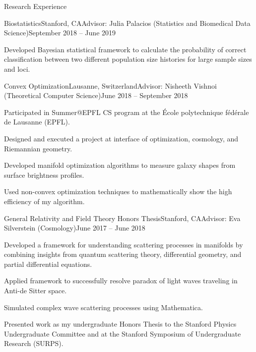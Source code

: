 \documentclass{resume} %
\begin{document}
\begin{rSection}{Research Experience}
\begin{rSubsection}{Biostatistics}{Stanford, CA}{Advisor: Julia Palacios (Statistics and Biomedical Data Science)}{September 2018 -- June 2019}
\item Developed Bayesian statistical framework to calculate the probability of correct classification between two different population size histories for large sample sizes and loci. 


\end{rSubsection}

\begin{rSubsection}{Convex Optimization}{Lausanne, Switzerland}{Advisor: Nisheeth Vishnoi (Theoretical Computer Science)}{June 2018 -- September 2018}
\item Participated in Summer@EPFL CS program at the \'Ecole polytechnique f\'ed\'erale de Lausanne (EPFL).
\item Designed and executed a project at interface of optimization, cosmology, and Riemannian geometry.
\item Developed manifold optimization algorithms to measure galaxy shapes from surface brightness profiles.
\item Used non-convex optimization techniques to mathematically show the high efficiency of my algorithm.
\end{rSubsection}
\begin{rSubsection}{General Relativity and Field Theory Honors Thesis}{Stanford, CA}{Advisor: Eva Silverstein (Cosmology)}{June 2017 -- June 2018}
\item Developed a framework for understanding scattering processes in manifolds by combining insights from quantum scattering theory, differential geometry, and partial differential equations. 
\item Applied framework to successfully resolve paradox of light waves traveling in Anti-de Sitter space. 
\item Simulated complex wave scattering processes using Mathematica. 
\item Presented work as my undergraduate Honors Thesis to the Stanford Physics Undergraduate Committee and at the Stanford Symposium of Undergraduate Research (SURPS).                        
\end{rSubsection}
\end{rSection}
\end{document}
